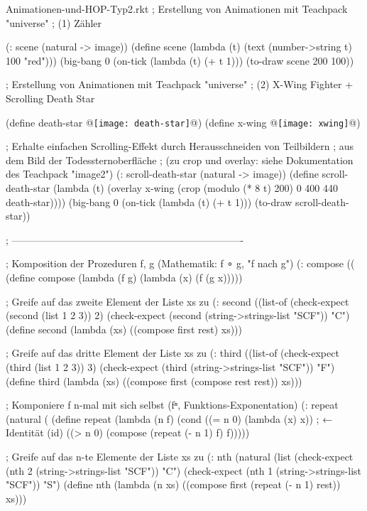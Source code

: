 \begin{filecontents*}{Animationen-und-HOP-Typ2.rkt}
; Erstellung von Animationen mit Teachpack "universe"
; (1) Zähler

(: scene (natural -> image))
(define scene
  (lambda (t)
    (text (number->string t) 100 "red")))
(big-bang 0
          (on-tick (lambda (t) (+ t 1)))
          (to-draw scene 200 100))




; Erstellung von Animationen mit Teachpack "universe"
; (2) X-Wing Fighter + Scrolling Death Star

(define death-star 
@\texttt{[image: death-star]}@)
(define x-wing @\texttt{[image: xwing]}@)


; Erhalte einfachen Scrolling-Effekt durch Herausschneiden von Teilbildern
; aus dem Bild der Todessternoberfläche
; (zu crop und overlay: siehe Dokumentation des Teachpack "image2")
(: scroll-death-star (natural -> image))
(define scroll-death-star
  (lambda (t)
    (overlay x-wing
             (crop (modulo (* 8 t) 200) 0 400 440 death-star))))
(big-bang 0
          (on-tick (lambda (t) (+ t 1)))
          (to-draw scroll-death-star))


; ----------------------------------------------------------------------

; Komposition der Prozeduren f, g (Mathematik: f ∘ g, "f nach g") 
(: compose ((%
(define compose
  (lambda (f g)
    (lambda (x)
      (f (g x)))))



; Greife auf das zweite Element der Liste xs zu
(: second ((list-of %
(check-expect (second (list 1 2 3)) 2)
(check-expect (second (string->strings-list "SCF")) "C")
(define second
  (lambda (xs)
    ((compose first rest) xs)))


; Greife auf das dritte Element der Liste xs zu
(: third ((list-of %
(check-expect (third  (list 1 2 3)) 3)
(check-expect (third (string->strings-list "SCF")) "F")
(define third
  (lambda (xs)
    ((compose first (compose rest rest)) xs)))


; Komponiere f n-mal mit sich selbst (fⁿ, Funktions-Exponentation)
(: repeat (natural (%
(define repeat
  (lambda (n f)
    (cond ((= n 0) (lambda (x) x))                      ; ← Identität (id)
          ((> n 0) (compose (repeat (- n 1) f) f))))) 


; Greife auf das n-te Elemente der Liste xs zu
(: nth (natural (list %
(check-expect (nth 2 (string->strings-list "SCF")) "C")
(check-expect (nth 1 (string->strings-list "SCF")) "S")
(define nth                   
  (lambda (n xs)                 
    ((compose first (repeat (- n 1) rest)) xs)))



\end{filecontents*}
